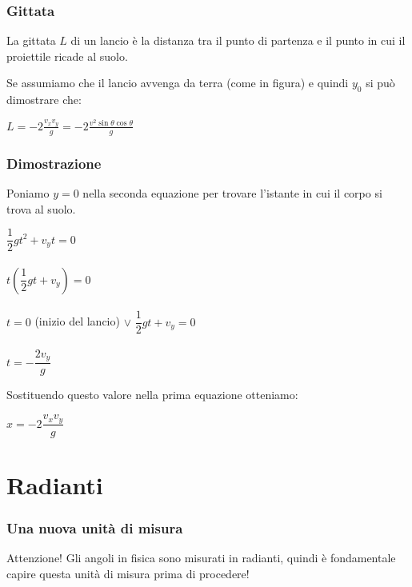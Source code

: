 \documentclass[]{beamer}
\theoremstyle{plain}
\begin{document}
\begin{frame}
  \frametitle{Gittata}
La gittata $ L $ di un lancio è la distanza tra il punto di partenza e il punto in cui il proiettile ricade al suolo.\pause

\begin{figure}
\end{figure}\pause

Se assumiamo che il lancio avvenga da terra (come in figura) e quindi $ y_0 $ si può dimostrare che:
\begin{center}
        \colorbox{blue!30}{$   L = - 2 \frac{v_x v_y}{g} = - 2 \frac{v^2 \sin\theta\cos\theta}{g} $}
    \end{center}




\end{frame}






\begin{frame}
  \frametitle{Dimostrazione}
  Poniamo $ y=0 $ nella seconda equazione per trovare l'istante in cui il corpo si trova al suolo.
\begin{center}
$  \dfrac{1}{2}gt^2 + v_y t = 0 $\\\pause~\\
$ t\left(\dfrac{1}{2}gt + v_y \right) = 0 $\\\pause~\\
$ t =0 $ (inizio del lancio) $ \vee $ $ \dfrac{1}{2}gt + v_y = 0 $ \\\pause~\\
$ t= -\dfrac{2v_y}{g} $
\end{center}\pause
Sostituendo questo valore nella prima equazione otteniamo:
\begin{center}
\colorbox{blue!30}{$   x = - 2 \dfrac{v_x v_y}{g} $}
\end{center}
\end{frame}

\section{Radianti}
\begin{frame}
  \frametitle{Una nuova unità di misura}
  \begin{alertblock}{Attenzione!}
    Gli angoli in fisica sono misurati in radianti, quindi è fondamentale capire questa unità di misura prima di procedere!
  \end{alertblock}
\end{frame}
\end{document}
